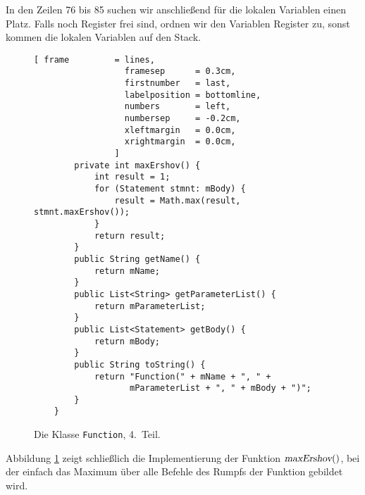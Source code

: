 In den Zeilen 76 bis 85 suchen wir anschlie{\ss}end f\"ur die lokalen Variablen einen Platz.
Falls noch Register frei sind, ordnen wir den Variablen Register zu, sonst kommen die lokalen Variablen
auf den Stack.

\begin{figure}[!ht]
\centering
\begin{Verbatim}[ frame         = lines, 
                  framesep      = 0.3cm, 
                  firstnumber   = last,
                  labelposition = bottomline,
                  numbers       = left,
                  numbersep     = -0.2cm,
                  xleftmargin   = 0.0cm,
                  xrightmargin  = 0.0cm,
                ]
        private int maxErshov() {
            int result = 1;
            for (Statement stmnt: mBody) { 
                result = Math.max(result, stmnt.maxErshov());
            }
            return result;
        }
        public String getName() {
            return mName;
        }
        public List<String> getParameterList() {
            return mParameterList;
        }
        public List<Statement> getBody() {
            return mBody;
        }
        public String toString() {
            return "Function(" + mName + ", " + 
                   mParameterList + ", " + mBody + ")";
        }
    }
\end{Verbatim}
\vspace*{-0.3cm} %
\caption{Die Klasse \texttt{Function}, 4.~Teil.}
\label{fig:Function.java-SRP-4}
\end{figure}

Abbildung \ref{fig:Function.java-SRP-4} zeigt schlie{\ss}lich die Implementierung der Funktion
$\textsl{maxErshov}()$, bei der einfach das Maximum \"uber alle Befehle des Rumpfs der
Funktion gebildet wird.

